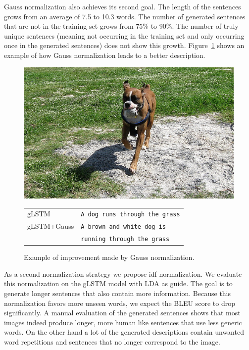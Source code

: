 \documentclass[twoside,twocolumn]{article}
\begin{document}
Gauss normalization also achieves its second goal. The length of the sentences grows from an average of 7.5 to 10.3 words. The number of generated sentences that are not in the training set grows from 75\% to 90\%. The number of truly unique sentences (meaning not occurring in the training set and only occurring once in the generated sentences) does not show this growth. Figure~\ref{fig:gauss} shows an example of how Gauss normalization leads to a better description.

\begin{figure}
	\centering
	\begin{minipage}[t]{.45\textwidth}
		\centering
		\vspace{0pt}
		\includegraphics[width=\textwidth]{Images/hond}
	\end{minipage}\hfill	
	\begin{minipage}[t]{.7\textwidth}
		\vspace{0pt}
		\begin{tabular}{ll}
			gLSTM & \texttt{A dog runs through the grass} \\
			gLSTM+Gauss & \texttt{A brown and white dog is}\\
			~ & \texttt{running through the grass} \\
		\end{tabular}
	\end{minipage}
\caption{Example of improvement made by Gauss normalization.}
\label{fig:gauss}
\end{figure}

As a second normalization strategy we propose idf normalization. We evaluate this normalization on the gLSTM model with LDA as guide. The goal is to generate longer sentences that also contain more information. Because this normalization favors more unseen words, we expect the BLEU score to drop significantly. A manual evaluation of the generated sentences shows that most images indeed produce longer, more human like sentences that use less generic words. On the other hand a lot of the generated descriptions contain unwanted word repetitions and sentences that no longer correspond to the image.
\end{document}
